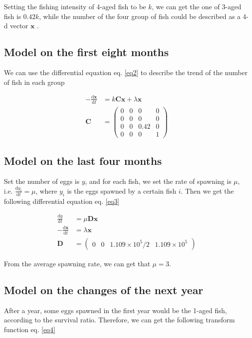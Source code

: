 \documentclass{IEEEtran}
\begin{document}
Setting the fishing intensity of 4-aged fish to be $k$, we can get the one of 3-aged fish is $0.42k$, while the number of the four group of fish could be described as a 4-d vector $\bm x$ .

\subsection{Model on the first eight months}

We can use the differential equation eq. \ref{eq2} to describe the trend of the number of fish in each group

\begin{align}
    \label{eq2}
    -\frac{\mathrm d \bm x}{\mathrm d t} &= k \mathbf C \bm x + \lambda \bm x \\
    \mathbf C &= \begin{pmatrix}0&0&0&0\\0&0&0&0\\0&0&0.42&0\\0&0&0&1\end{pmatrix}
\end{align}
\subsection{Model on the last four months}
Set the number of eggs is $y$, and for each fish, we set the rate of spawning is $\mu$, i.e. $\frac {\mathrm d y_i}{\mathrm d t} = \mu$, where $y_i$ is the eggs spawned by a certain fish $i$. Then we get the following differential equation eq. \ref{eq3}

\begin{align}
    \label{eq3}
    \frac {\mathrm d y}{\mathrm d t} &= \mu \mathbf D \bm x\\
    -\frac{\mathrm d \bm x}{\mathrm d t} &=\lambda \bm x\\
    \mathbf D &= \begin{pmatrix} 0 & 0 & 1.109\times10^5/2&1.109\times10^5\end{pmatrix}
\end{align}

From the average spawning rate, we can get that $\mu = 3$.

\subsection{Model on the changes of the next year}

After a year, some eggs spawned in the first year would be the 1-aged fish, according to the survival ratio. Therefore, we can get the following transform function eq. \ref{eq4}
\end{document}

